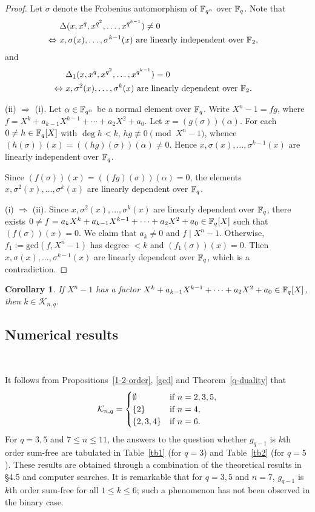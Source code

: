 \documentclass{amsart}
\newtheorem{cor}[thm]{Corollary}
\numberwithin{equation}{section}
\theoremstyle{definition}
\newcommand{\f}{\Bbb F}
\begin{document}
\begin{proof}
Let $\sigma$ denote the Frobenius automorphism  of $\f_{q^n}$ over $\f_q$. Note that 
\begin{align*}
&\Delta(x,x^q,x^{q^2},\dots,x^{q^{k-1}})\ne0\cr
\Leftrightarrow\ &x,\sigma(x),\dots,\sigma^{k-1}(x)\ \text{are linearly independent over}\ \f_2,
\end{align*}
and 
\begin{align*}
&\Delta_1(x,x^q,x^{q^2},\dots,x^{q^{k-1}})=0\cr
\Leftrightarrow\ &x,\sigma^2(x),\dots,\sigma^{k}(x)\ \text{are linearly dependent over}\ \f_2.
\end{align*}

\medskip
(ii) $\Rightarrow$ (i). Let $\alpha\in\f_{q^n}$ be a normal element over $\f_q$. Write $X^n-1=fg$, where $f=X^k+a_{k-1}X^{k-1}+\cdots+a_2X^2+a_0$. Let $x=(g(\sigma))(\alpha)$. For each $0\ne h\in\f_q[X]$ with $\deg h<k$, $hg\not\equiv 0\pmod{X^n-1}$, whence $(h(\sigma))(x)=((hg)(\sigma))(\alpha)\ne 0$. Hence $x,\sigma(x),\dots,\sigma^{k-1}(x)$ are linearly independent over $\f_q$. 

Since $(f(\sigma))(x)=((fg)(\sigma))(\alpha)=0$, the elements $x,\sigma^2(x),\dots,\sigma^k(x)$ are linearly dependent over $\f_q$.

\medskip
(i) $\Rightarrow$ (ii). Since $x,\sigma^2(x),\dots,\sigma^k(x)$ are linearly dependent over $\f_q$, there exists $0\ne f=a_kX^k+a_{k-1}X^{k-1}+\cdots+a_2X^2+a_0\in\f_q[X]$ such that $(f(\sigma))(x)=0$. We claim that $a_k\ne0$ and $f\mid X^n-1$. Otherwise, $f_1:=\text{gcd}(f,X^n-1)$ has degree $<k$ and $(f_1(\sigma))(x)=0$. Then $x,\sigma(x),\dots,\sigma^{k-1}(x)$ are linearly dependent over $\f_q$, which is a contradiction. 
\end{proof}

\begin{cor}\label{C3.8}
If $X^n-1$ has a factor $X^k+a_{k-1}X^{k-1}+\cdots+a_2X^2+a_0\in\f_q[X]$, then $k\in\mathcal K_{n,q}$.
\end{cor}

\subsection{Numerical results}\

It follows from Propositions~\ref{1-2-order}, \ref{gcd} and Theorem~\ref{q-duality} that
\[
\mathcal K_{n,q}=\begin{cases}
\emptyset&\text{if}\ n=2,3,5,\cr
\{2\}&\text{if}\ n=4,\cr
\{2,3,4\}&\text{if}\ n=6.
\end{cases}
\]
For $q=3,5$ and $7\le n\le 11$, the answers to the question whether $g_{q-1}$ is $k$th order sum-free are tabulated in Table~\ref{tb1} (for $q=3$) and Table~\ref{tb2} (for $q=5$). These results are obtained through a combination of the theoretical results in \S4.5 and computer searches. It is remarkable that for $q=3,5$ and $n=7$, $g_{q-1}$ is $k$th order sum-free for all $1\le k\le 6$; such a phenomenon has not been observed in the binary case.
\end{document}
